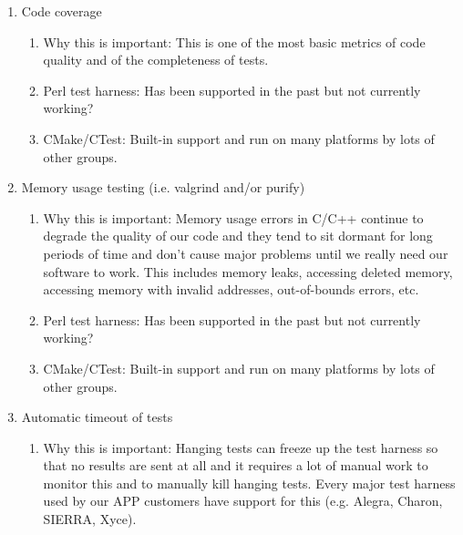 \documentclass[pdf,ps2pdf,11pt]{SANDreport}
\begin{document}
\begin{enumerate}

{}\item Code coverage

  \begin{enumerate}

  {}\item Why this is important: This is one of the most basic
  metrics of code quality and of the completeness of tests.

  {}\item Perl test harness: Has been supported in the past but not
  currently working?

  {}\item CMake/CTest: Built-in support and run on many platforms by
  lots of other groups.

  \end{enumerate}

{}\item Memory usage testing (i.e. valgrind and/or purify)

  \begin{enumerate}

  {}\item Why this is important: Memory usage errors in C/C++
  continue to degrade the quality of our code and they tend to sit
  dormant for long periods of time and don't cause major problems
  until we really need our software to work.  This includes memory
  leaks, accessing deleted memory, accessing memory with invalid
  addresses, out-of-bounds errors, etc.

  {}\item Perl test harness: Has been supported in the past but not
  currently working?

  {}\item CMake/CTest: Built-in support and run on many platforms by
  lots of other groups.

  \end{enumerate}

{}\item Automatic timeout of tests

  \begin{enumerate}

  {}\item Why this is important: Hanging tests can freeze up the
  test harness so that no results are sent at all and it requires a
  lot of manual work to monitor this and to manually kill hanging
  tests.  Every major test harness used by our APP customers have
  support for this (e.g. Alegra, Charon, SIERRA, Xyce).


\end{enumerate}
\end{enumerate}
\end{document}
